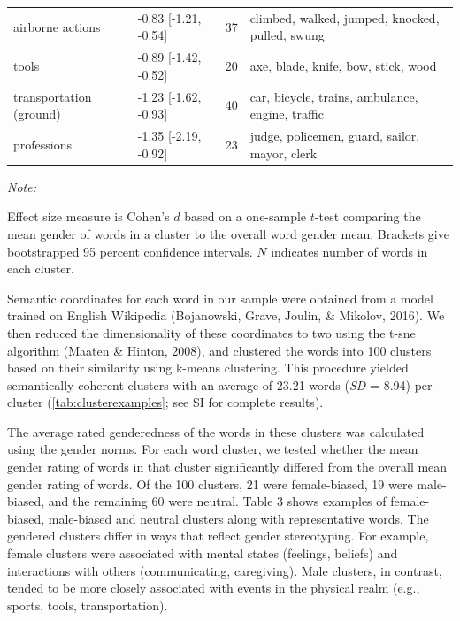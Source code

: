 \documentclass[english,,man,floatsintext]{apa6}
\begin{document}
\begin{table}
{\begin{threeparttable}
\begin{tabular}[t]{llrl}
\hspace{1em}airborne actions & -0.83 [-1.21, -0.54] & 37 & climbed, walked, jumped, knocked, pulled, swung\\
\hspace{1em}tools & -0.89 [-1.42, -0.52] & 20 & axe, blade, knife, bow, stick, wood\\
\hspace{1em}transportation (ground) & -1.23 [-1.62, -0.93] & 40 & car, bicycle, trains, ambulance, engine, traffic\\
\hspace{1em}professions & -1.35 [-2.19, -0.92] & 23 & judge, policemen, guard, sailor, mayor, clerk\\
\bottomrule
\end{tabular}
\begin{tablenotes}[para]
\item \textit{Note:} 
\item Effect size measure is Cohen's $d$ based on a one-sample $t$-test comparing the mean gender of words in a cluster to the overall word gender mean. Brackets give bootstrapped 95 percent confidence intervals. $N$ indicates number of words in each cluster.
\end{tablenotes}
\end{threeparttable}}
\end{table}

Semantic coordinates for each word in our sample were obtained from a model trained on English Wikipedia (Bojanowski, Grave, Joulin, \& Mikolov, 2016). We then reduced the dimensionality of these coordinates to two using the t-sne algorithm (Maaten \& Hinton, 2008), and clustered the words into 100 clusters based on their similarity using k-means clustering. This procedure yielded semantically coherent clusters with an average of 23.21 words (\emph{SD} = 8.94) per cluster (\autoref{tab:clusterexamples}; see SI for complete results).

The average rated genderedness of the words in these clusters was calculated using the gender norms. For each word cluster, we tested whether the mean gender rating of words in that cluster significantly differed from the overall mean gender rating of words. Of the 100 clusters, 21 were female-biased, 19 were male-biased, and the remaining 60 were neutral. Table 3 shows examples of female-biased, male-biased and neutral clusters along with representative words. The gendered clusters differ in ways that reflect gender stereotyping. For example, female clusters were associated with mental states (feelings, beliefs) and interactions with others (communicating, caregiving). Male clusters, in contrast, tended to be more closely associated with events in the physical realm (e.g., sports, tools, transportation).
\end{document}
